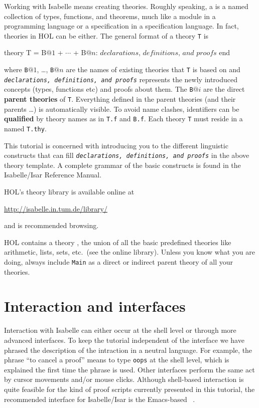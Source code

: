 Working with Isabelle means creating theories. Roughly speaking, a
 is a named collection of types, functions, and theorems,
much like a module in a programming language or a specification in a
specification language. In fact, theories in HOL can be either. The general
format of a theory \texttt{T} is
\begin{ttbox}
theory T = B\(@1\) + \(\cdots\) + B\(@n\):
\(\textit{declarations, definitions, and proofs}\)
end
\end{ttbox}
where \texttt{B}$@1$, \dots, \texttt{B}$@n$ are the names of existing
theories that \texttt{T} is based on and \texttt{\textit{declarations,
    definitions, and proofs}} represents the newly introduced concepts
(types, functions etc) and proofs about them. The \texttt{B}$@i$ are the
direct \textbf{parent theories} of \texttt{T}.
Everything defined in the parent theories (and their parents \dots) is
automatically visible. To avoid name clashes, identifiers can be
\textbf{qualified} by theory names as in \texttt{T.f} and
\texttt{B.f}. Each theory \texttt{T} must
reside in a  named \texttt{T.thy}.

This tutorial is concerned with introducing you to the different linguistic
constructs that can fill \textit{\texttt{declarations, definitions, and
    proofs}} in the above theory template.  A complete grammar of the basic
constructs is found in the Isabelle/Isar Reference Manual.

HOL's theory library is available online at
\begin{center}\small
    \url{http://isabelle.in.tum.de/library/}
\end{center}
and is recommended browsing.
\begin{warn}
  HOL contains a theory , the union of all the basic
  predefined theories like arithmetic, lists, sets, etc.\ (see the online
  library).  Unless you know what you are doing, always include \texttt{Main}
  as a direct or indirect parent theory of all your theories.
\end{warn}


\section{Interaction and interfaces}

Interaction with Isabelle can either occur at the shell level or through more
advanced interfaces. To keep the tutorial independent of the interface we
have phrased the description of the intraction in a neutral language. For
example, the phrase ``to cancel a proof'' means to type \texttt{oops} at the
shell level, which is explained the first time the phrase is used. Other
interfaces perform the same act by cursor movements and/or mouse clicks.
Although shell-based interaction is quite feasible for the kind of proof
scripts currently presented in this tutorial, the recommended interface for
Isabelle/Isar is the Emacs-based ~\cite{Aspinall:TACAS:2000,proofgeneral}.

